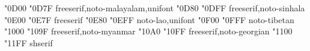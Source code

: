\documentclass{article}
\begin{document}
                                      {  "0D00} {  "0D7F} {freeserif,noto-malayalam,unifont}
                                        {  "0D80} {  "0DFF} {freeserif,noto-sinhala}
                                           {  "0E00} {  "0E7F} {freeserif}
                                            {  "0E80} {  "0EFF} {noto-lao,unifont}
                                        {  "0F00} {  "0FFF} {noto-tibetan}
                                        {  "1000} {  "109F} {freeserif,noto-myanmar}
                                       {  "10A0} {  "10FF} {freeserif,noto-georgian}
                                    {  "1100} {  "11FF} {shserif}
\end{document}
